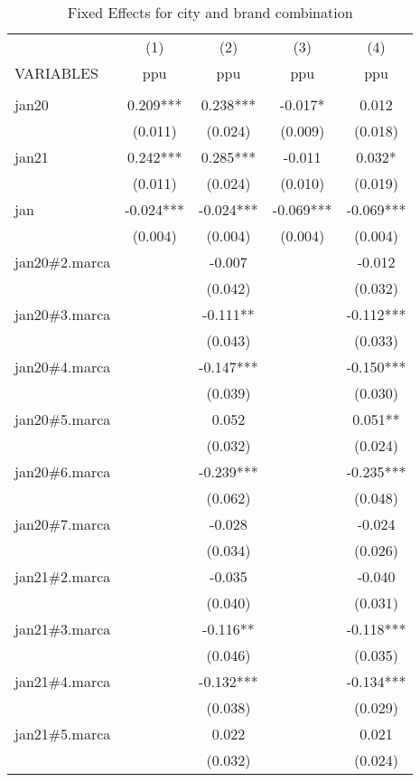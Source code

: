 \begin{longtable}{lcccc} 
\caption{Fixed Effects for city and brand combination}\label{tab:1}\\	
	\hline
 & (1) & (2) & (3) & (4) \\
VARIABLES & ppu & ppu & ppu & ppu \\ \hline
 &  &  &  &  \\
jan20 & 0.209*** & 0.238*** & -0.017* & 0.012 \\
& (0.011) & (0.024) & (0.009) & (0.018) \\
jan21 & 0.242*** & 0.285*** & -0.011 & 0.032* \\
& (0.011) & (0.024) & (0.010) & (0.019) \\
jan & -0.024*** & -0.024*** & -0.069*** & -0.069*** \\
& (0.004) & (0.004) & (0.004) & (0.004) \\
jan20\#2.marca &  & -0.007 &  & -0.012 \\
 &  & (0.042) &  & (0.032) \\
jan20\#3.marca &  & -0.111** &  & -0.112*** \\
 &  & (0.043) &  & (0.033) \\
jan20\#4.marca &  & -0.147*** &  & -0.150*** \\
 &  & (0.039) &  & (0.030) \\
jan20\#5.marca &  & 0.052 &  & 0.051** \\
 &  & (0.032) &  & (0.024) \\
jan20\#6.marca &  & -0.239*** &  & -0.235*** \\
 &  & (0.062) &  & (0.048) \\
jan20\#7.marca &  & -0.028 &  & -0.024 \\
 &  & (0.034) &  & (0.026) \\
jan21\#2.marca &  & -0.035 &  & -0.040 \\
 &  & (0.040) &  & (0.031) \\
jan21\#3.marca &  & -0.116** &  & -0.118*** \\
 &  & (0.046) &  & (0.035) \\
jan21\#4.marca &  & -0.132*** &  & -0.134*** \\
 &  & (0.038) &  & (0.029) \\
jan21\#5.marca &  & 0.022 &  & 0.021 \\
 &  & (0.032) &  & (0.024) \\

\end{longtable}
